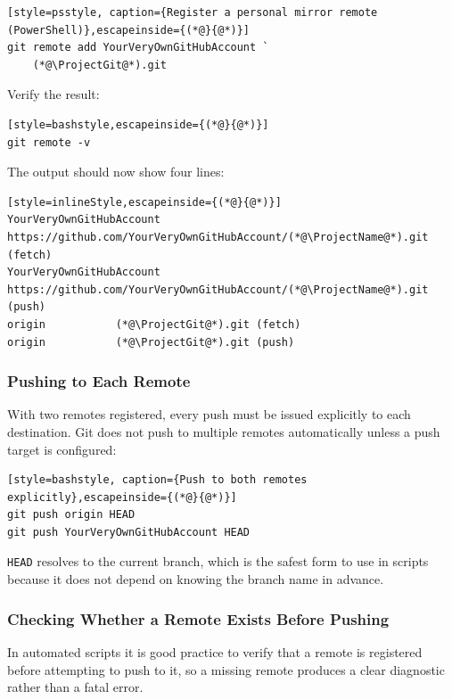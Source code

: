 \begin{lstlisting}[style=psstyle, caption={Register a personal mirror remote (PowerShell)},escapeinside={(*@}{@*)}]
git remote add YourVeryOwnGitHubAccount `
    (*@\ProjectGit@*).git
\end{lstlisting}

Verify the result:

\begin{lstlisting}[style=bashstyle,escapeinside={(*@}{@*)}]
git remote -v
\end{lstlisting}

The output should now show four lines:

\begin{lstlisting}[style=inlineStyle,escapeinside={(*@}{@*)}]
YourVeryOwnGitHubAccount  https://github.com/YourVeryOwnGitHubAccount/(*@\ProjectName@*).git (fetch)
YourVeryOwnGitHubAccount  https://github.com/YourVeryOwnGitHubAccount/(*@\ProjectName@*).git (push)
origin           (*@\ProjectGit@*).git (fetch)
origin           (*@\ProjectGit@*).git (push)
\end{lstlisting}

\subsubsection{Pushing to Each Remote}

With two remotes registered, every push must be issued explicitly to
each destination. Git does not push to multiple remotes automatically
unless a push target is configured:

\begin{lstlisting}[style=bashstyle, caption={Push to both remotes explicitly},escapeinside={(*@}{@*)}]
git push origin HEAD
git push YourVeryOwnGitHubAccount HEAD
\end{lstlisting}

\texttt{HEAD} resolves to the current branch, which is the safest form
to use in scripts because it does not depend on knowing the branch name
in advance.

\subsubsection{Checking Whether a Remote Exists Before Pushing}

In automated scripts it is good practice to verify that a remote is
registered before attempting to push to it, so a missing remote produces
a clear diagnostic rather than a fatal error.

